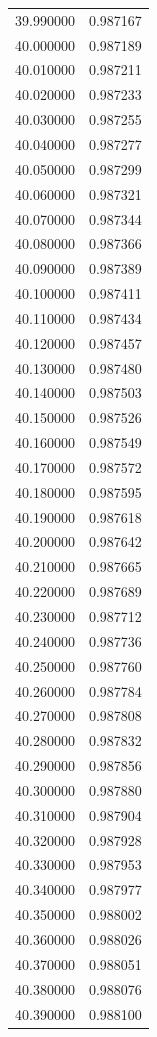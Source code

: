 \begin{tabular}{rr}
39.990000 & 0.987167 \\
40.000000 & 0.987189 \\
40.010000 & 0.987211 \\
40.020000 & 0.987233 \\
40.030000 & 0.987255 \\
40.040000 & 0.987277 \\
40.050000 & 0.987299 \\
40.060000 & 0.987321 \\
40.070000 & 0.987344 \\
40.080000 & 0.987366 \\
40.090000 & 0.987389 \\
40.100000 & 0.987411 \\
40.110000 & 0.987434 \\
40.120000 & 0.987457 \\
40.130000 & 0.987480 \\
40.140000 & 0.987503 \\
40.150000 & 0.987526 \\
40.160000 & 0.987549 \\
40.170000 & 0.987572 \\
40.180000 & 0.987595 \\
40.190000 & 0.987618 \\
40.200000 & 0.987642 \\
40.210000 & 0.987665 \\
40.220000 & 0.987689 \\
40.230000 & 0.987712 \\
40.240000 & 0.987736 \\
40.250000 & 0.987760 \\
40.260000 & 0.987784 \\
40.270000 & 0.987808 \\
40.280000 & 0.987832 \\
40.290000 & 0.987856 \\
40.300000 & 0.987880 \\
40.310000 & 0.987904 \\
40.320000 & 0.987928 \\
40.330000 & 0.987953 \\
40.340000 & 0.987977 \\
40.350000 & 0.988002 \\
40.360000 & 0.988026 \\
40.370000 & 0.988051 \\
40.380000 & 0.988076 \\
40.390000 & 0.988100 \\

\end{tabular}
